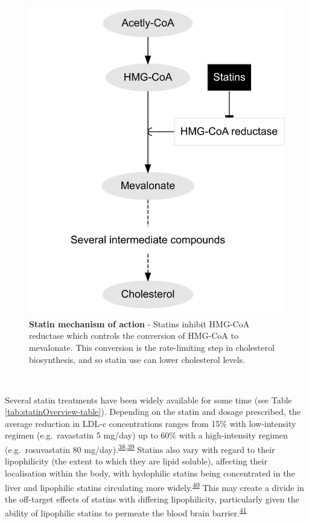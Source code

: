 \documentclass[a4paper, twoside]{templates/ociamthesis}
\begin{document}
~





\begin{figure}[H]

{\centering \includegraphics[width=0.5\linewidth]{figures/background/statinPath} 

}

\caption[Statin mechanism of action]{\textbf{Statin mechanism of action} - Statins inhibit HMG-CoA reductase which controls the conversion of HMG-CoA to mevalonate. This conversion is the rate-limiting step in cholesterol biosynthesis, and so statin use can lower cholesterol levels.}\label{fig:statin-mechanisam}
\end{figure}

~

Several statin treatments have been widely available for some time (see Table \ref{tab:statinOverview-table}). Depending on the statin and dosage prescribed, the average reduction in LDL-c concentrations ranges from 15\% with low-intensity regimen (e.g.~ravastatin 5 mg/day) up to 60\% with a high-intensity regimen (e.g.~rosuvastatin 80 mg/day).\textsuperscript{\protect\hyperlink{ref-collins2016}{38},\protect\hyperlink{ref-law2003}{39}} Statins also vary with regard to their lipophilicity (the extent to which they are lipid soluble), affecting their localisation within the body, with hydophilic statins being concentrated in the liver and lipophilic statins circulating more widely.\textsuperscript{\protect\hyperlink{ref-schachter2005}{40}} This may create a divide in the off-target effects of statins with differing lipophilicity, particularly given the ability of lipophilic statins to permeate the blood brain barrier.\textsuperscript{\protect\hyperlink{ref-sierra2011}{41}}
\end{document}
